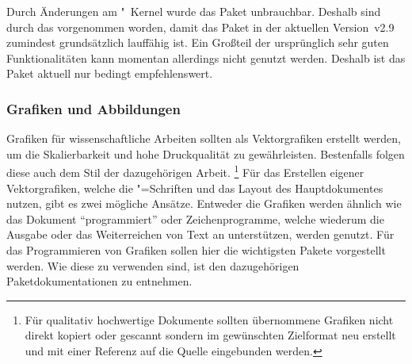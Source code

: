 \begin{DeclarePackages}[Tabellen|?]
  
  Durch Änderungen am "~Kernel wurde das Paket unbrauchbar. 
  Deshalb sind durch das  vorgenommen worden, damit das Paket in der aktuellen Version~v2.9 zumindest 
  grundsätzlich lauffähig ist. Ein Großteil der ursprünglich sehr guten 
  Funktionalitäten kann momentan allerdings nicht genutzt werden. Deshalb ist 
  das Paket aktuell nur bedingt empfehlenswert.
\end{DeclarePackages}



\subsubsection{%
  Grafiken und Abbildungen%
}

Grafiken für wissenschaftliche Arbeiten sollten als Vektorgrafiken erstellt 
werden, um die Skalierbarkeit und hohe Druckqualität zu gewährleisten. 
Bestenfalls folgen diese auch dem Stil der dazugehörigen Arbeit.%
\footnote{%
  Für qualitativ hochwertige Dokumente sollten übernommene Grafiken nicht 
  direkt kopiert oder gescannt sondern im gewünschten Zielformat neu erstellt 
  und mit einer Referenz auf die Quelle eingebunden werden.%
}
Für das Erstellen eigener Vektorgrafiken, welche die "=Schriften 
und das Layout des Hauptdokumentes nutzen, gibt es zwei mögliche Ansätze. 
Entweder die Grafiken werden ähnlich wie das Dokument \enquote{programmiert} 
oder Zeichenprogramme, welche wiederum die Ausgabe oder das Weiterreichen von 
Text an  unterstützen, werden genutzt. 
Für das Programmieren von Grafiken sollen hier die wichtigsten Pakete 
vorgestellt werden. Wie diese zu verwenden sind, ist den dazugehörigen 
Paketdokumentationen zu entnehmen. 

